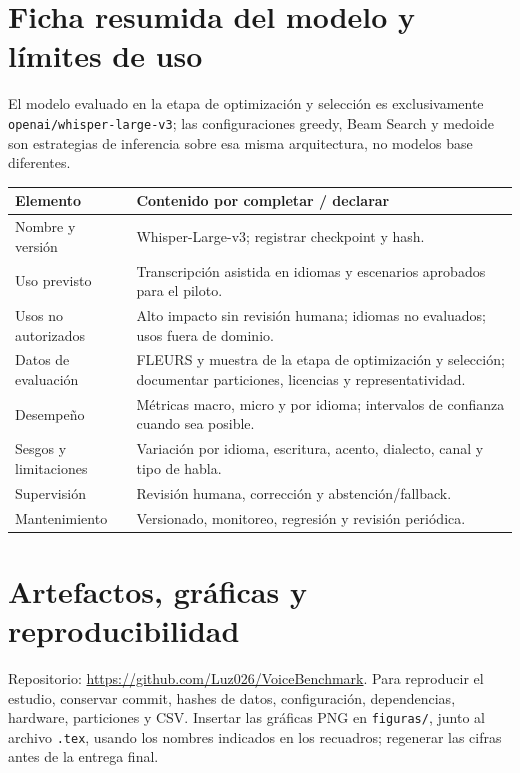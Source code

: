 \documentclass[11pt,letterpaper]{article}
\renewcommand{\arraystretch}{1.15}
\begin{document}
\section{Ficha resumida del modelo y límites de uso}
El modelo evaluado en la etapa de optimización y selección es exclusivamente \texttt{openai/whisper-large-v3}; las configuraciones greedy, Beam Search y medoide son estrategias de inferencia sobre esa misma arquitectura, no modelos base diferentes.
{\scriptsize
\setlength{\tabcolsep}{3pt}
\renewcommand{\arraystretch}{0.88}
\begin{longtable}{p{}p{}}
\textbf{Elemento} & \textbf{Contenido por completar / declarar}\\\hline
Nombre y versión & Whisper-Large-v3; registrar checkpoint y hash.\\
Uso previsto & Transcripción asistida en idiomas y escenarios aprobados para el piloto.\\
Usos no autorizados & Alto impacto sin revisión humana; idiomas no evaluados; usos fuera de dominio.\\
Datos de evaluación & FLEURS y muestra de la etapa de optimización y selección; documentar particiones, licencias y representatividad.\\
Desempeño & Métricas macro, micro y por idioma; intervalos de confianza cuando sea posible.\\
Sesgos y limitaciones & Variación por idioma, escritura, acento, dialecto, canal y tipo de habla.\\
Supervisión & Revisión humana, corrección y abstención/fallback.\\
Mantenimiento & Versionado, monitoreo, regresión y revisión periódica.\\
\end{longtable}
}

\section{Artefactos, gráficas y reproducibilidad}
Repositorio: \url{https://github.com/Luz026/VoiceBenchmark}. Para reproducir el estudio, conservar commit, hashes de datos, configuración, dependencias, hardware, particiones y CSV. Insertar las gráficas PNG en \texttt{figuras/}, junto al archivo \texttt{.tex}, usando los nombres indicados en los recuadros; regenerar las cifras antes de la entrega final.
\end{document}
